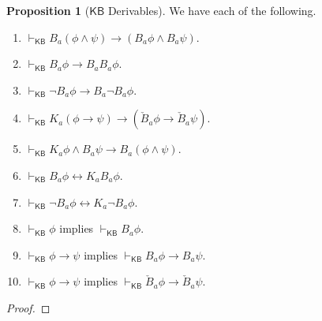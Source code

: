 \documentclass[12pt]{article}
\theoremstyle{definition}
\newtheorem{proposition}[theorem]{Proposition}
\newcommand{\KB}{{\mathsf{KB}}}                     %
\begin{document}
\begin{proposition}[$\KB$ Derivables]
  \label{prop:KB-derivables}
  We have each of the following.
  \begin{enumerate}
  \item $\vdash_\KB B_a(\phi\land\psi)\to(B_a\phi\land B_a\psi)$.

  \item $\vdash_\KB B_a\phi\to B_aB_a\phi$.

  \item $\vdash_\KB \lnot B_a\phi\to B_a\lnot B_a\phi$.

  \item $\vdash_\KB K_a(\phi\to\psi)\to(\check B_a\phi\to\check B_a\psi)$.

  \item $\vdash_\KB K_a\phi\land B_a\psi\to B_a(\phi\land\psi)$.

  \item $\vdash_\KB B_a\phi\leftrightarrow K_aB_a\phi$.

  \item $\vdash_\KB \lnot B_a\phi\leftrightarrow K_a\lnot B_a\phi$.

  \item $\vdash_\KB\phi$ implies $\vdash_\KB B_a\phi$.

  \item $\vdash_\KB\phi\to\psi$ implies $\vdash_\KB B_a\phi\to B_a\psi$.

  \item $\vdash_\KB\phi\to\psi$ implies $\vdash_\KB\check
    B_a\phi\to\check B_a\psi$.
  \end{enumerate}
\end{proposition}
\begin{proof}
\end{proof}
\end{document}
